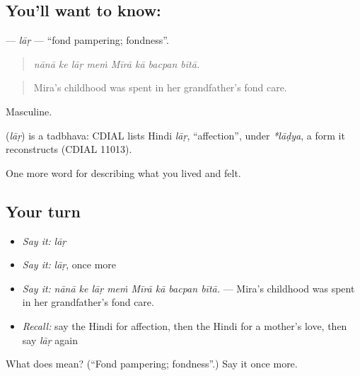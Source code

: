 \subsection*{You'll want to know: }
\textbf{} — \emph{lāṛ} — \textquotedblleft{}fond pampering; fondness\textquotedblright{}.

\begin{quote}
       
\end{quote}

\begin{quote}
\emph{nānā ke lāṛ meṁ Mīrā kā bacpan bītā.}
\end{quote}

\begin{quote}
Mira's childhood was spent in her grandfather's fond care.
\end{quote}

Masculine.

\begin{cousinweb}
\textbf{} (\emph{lāṛ}) is a tadbhava: CDIAL lists Hindi \emph{lāṛ}, \textquotedblleft{}affection\textquotedblright{}, under \emph{*lāḍya}, a form it reconstructs (CDIAL 11013).
\end{cousinweb}

\begin{grammarlens}[title={What you've built}]
One more word for describing what you lived and felt.
\end{grammarlens}

\subsection*{Your turn}
\begin{itemize}
\raggedright
  \item \emph{Say it:} \emph{lāṛ}
  \item \emph{Say it:} \emph{lāṛ}, once more
  \item \emph{Say it:} \emph{nānā ke lāṛ meṁ Mīrā kā bacpan bītā.} — Mira's childhood was spent in her grandfather's fond care.
  \item \emph{Recall:} say the Hindi for affection, then the Hindi for a mother's love, then say \emph{lāṛ} again
\end{itemize}

\begin{tcolorbox}[breakable,colback=teal!4,colframe=teal!35!black,title={Before you move on}]
What does  mean? (\textquotedblleft{}Fond pampering; fondness\textquotedblright{}.) Say it once more.
\end{tcolorbox}
